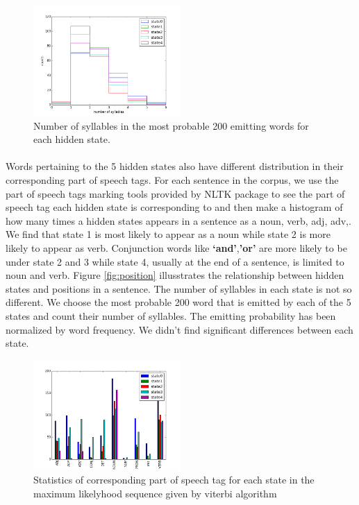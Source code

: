  \begin{figure}
 \centering
 \includegraphics[width=0.5\textwidth]{./figure/numberofsyllablesinstates.png}
 \caption{Number of syllables in the most probable 200 emitting words for each hidden state.}
\end{figure}

\paragraph{}
Words pertaining to the 5 hidden states also have different distribution in their corresponding part of speech tags.  For each sentence in the corpus, we use the part of speech tags marking tools provided by NLTK package to see the part of speech tag each hidden state is corresponding to and then make a histogram of how many times a hidden states appears in a sentence as a noun, verb, adj, adv,. We find that state 1 is most likely to appear as a noun while state 2 is more likely to appear as verb. Conjunction words like \textbf{‘and’},\textbf{’or'} are more likely to be under state 2 and 3 while state 4, usually at the end of a sentence, is limited to noun and verb. Figure \ref{fig:position} illusstrates the relationship between hidden states and positions in a sentence.
The number of syllables in each state is not so different. We choose the most probable 200 word that is emitted by each of the 5 states and count their number of syllables. The emitting probability has been normalized by word frequency. We didn’t find significant differences between each state. 

 \begin{figure}[h]
 \centering
 \includegraphics[width=0.5\textwidth]{./figure/hiddenstate_partofspeechtag.png}
 \caption{Statistics of corresponding part of speech tag for each state in the maximum likelyhood sequence given by viterbi algorithm}
 \end{figure}


